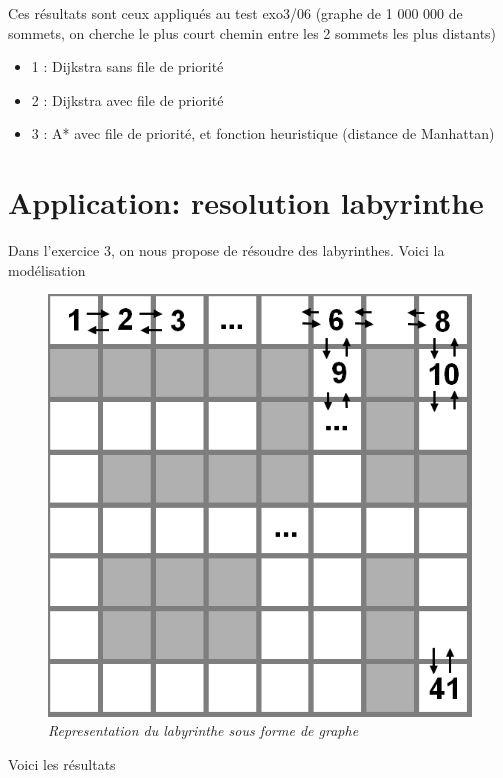 \documentclass[10pt]{article}
\begin{document}
			Ces résultats sont ceux appliqués au test exo3/06\newline
			(graphe de 1 000 000 de sommets, on cherche le plus court chemin entre les 2 sommets les plus distants)
			
			\begin{itemize}[label=-]
				\item 1 : Dijkstra sans file de priorité
				\item 2 : Dijkstra avec file de priorité
				\item 3 : A* avec file de priorité, et fonction heuristique (distance de Manhattan)
			\end{itemize}
			
	\newpage
	\section{Application: resolution labyrinthe}
		Dans l'exercice 3, on nous propose de résoudre des labyrinthes.
		Voici la modélisation
		\begin{figure}[H]
			\begin{center}
				\includegraphics[width=12cm,height=\textheight,keepaspectratio]{./images/lab.png}
			\end{center}
			\caption{\textit{Representation du labyrinthe sous forme de graphe}}
		\end{figure}
		Voici les résultats 
\end{document}

